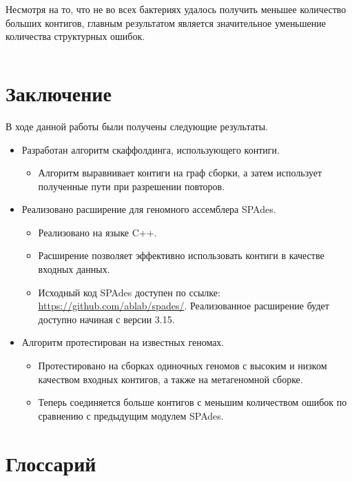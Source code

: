 \documentclass[14pt]{matmex-diploma-custom}
\begin{document}
Несмотря на то, что не во всех бактериях удалось получить меньшее количество больших контигов, главным результатом является значительное уменьшение количества структурных ошибок.

\newpage
\[\]
\newpage
\section*{Заключение}
В ходе данной работы были получены следующие результаты.
\begin{itemize}
    \item Разработан алгоритм скаффолдинга, использующего контиги.
	\begin{itemize}
		\item Алгоритм выравнивает контиги на граф сборки, а затем использует полученные пути при разрешении повторов.
	\end{itemize}
    \item Реализовано расширение для геномного ассемблера SPAdes.
	\begin{itemize}
		\item Реализовано на языке C++.
		\item Расширение позволяет эффективно использовать контиги в качестве входных данных.
		\item \begin{sloppypar} Исходный код SPAdes доступен по ссылке: \mbox{\url{https://github.com/ablab/spades/}}. Реализованное расширение будет доступно начиная с версии 3.15. \end{sloppypar}
	\end{itemize}
    \item Алгоритм протестирован на известных геномах.
	\begin{itemize}
		\item Протестировано на сборках одиночных геномов с высоким и низком качеством входных контигов, а также на метагеномной сборке.
		\item Теперь соединяется больше контигов с меньшим количеством ошибок по сравнению с предыдущим модулем SPAdes.
	\end{itemize}
\end{itemize}


\section*{Глоссарий}
\end{document}
